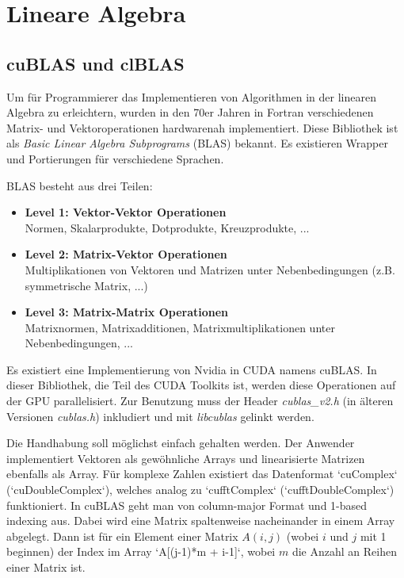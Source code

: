 	\section{Lineare Algebra}
		\subsection{cuBLAS und clBLAS}
		Um für Programmierer das Implementieren von Algorithmen in der linearen Algebra zu erleichtern, wurden in den 70er Jahren in Fortran verschiedenen Matrix- und Vektoroperationen hardwarenah implementiert. Diese Bibliothek ist als \textit{Basic Linear Algebra Subprograms} (BLAS) bekannt. Es existieren Wrapper und Portierungen für verschiedene Sprachen.
	
		BLAS besteht aus drei Teilen:
		\begin{itemize}
			\item \textbf{Level 1: Vektor-Vektor Operationen}\\
			Normen, Skalarprodukte, Dotprodukte, Kreuzprodukte, ...
			\item \textbf{Level 2: Matrix-Vektor Operationen}\\ Multiplikationen von Vektoren und Matrizen unter Nebenbedingungen (z.B. symmetrische Matrix, ...)
			\item \textbf{Level 3: Matrix-Matrix Operationen}\\Matrixnormen, Matrixadditionen, Matrixmultiplikationen unter Nebenbedingungen, ...
		\end{itemize}
		
		Es existiert eine Implementierung von Nvidia in CUDA namens cuBLAS. In dieser Bibliothek, die Teil des CUDA Toolkits ist, werden diese Operationen auf der GPU parallelisiert. Zur Benutzung muss der Header \textit{cublas{\_}v2.h} (in älteren Versionen \textit{cublas.h}) inkludiert und mit \textit{libcublas} gelinkt werden.
		
		Die Handhabung soll möglichst einfach gehalten werden. Der Anwender implementiert Vektoren als gewöhnliche Arrays und linearisierte Matrizen ebenfalls als Array. Für komplexe Zahlen existiert das Datenformat \li`cuComplex` (\li`cuDoubleComplex`), welches analog zu \li`cufftComplex` (\li`cufftDoubleComplex`) funktioniert. In cuBLAS geht man von column-major Format und 1-based indexing aus. Dabei wird eine Matrix spaltenweise nacheinander in einem Array abgelegt. Dann ist für ein Element einer Matrix $A(i,j)$ (wobei $i$ und $j$ mit 1 beginnen) der Index im Array \li`A[(j-1)*m + i-1]`, wobei $m$ die Anzahl an Reihen einer Matrix ist. 
		
